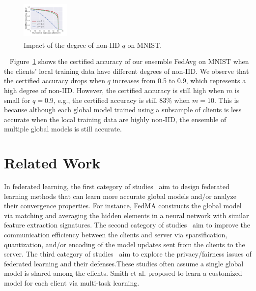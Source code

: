 \documentclass[letterpaper]{article} %
\newcommand{\myparatight}[1]{\smallskip\noindent{\bf {#1}:}~}
\begin{document}
\begin{figure}[!t]
\center
\includegraphics[width=0.20700000000000002\textwidth,height=0.76in ]{./figs/mnist/mnist_cnn_k10_bias.pdf}
\caption{Impact of the degree of non-IID $q$ on MNIST.}
\label{fig:q}
\end{figure}

\myparatight{Impact of degree of non-IID $q$} Figure~\ref{fig:q} shows the certified accuracy of our ensemble FedAvg on MNIST when the clients' local training data have different degrees of non-IID. We observe that the certified accuracy drops when $q$ increases from 0.5 to 0.9, which represents a high degree of non-IID. However, the certified accuracy is still high when $m$ is small for $q=0.9$, e.g., the certified accuracy is still 83\% when $m=10$.  This is because  although each global model trained using a subsample of clients is less accurate when the local training data are highly non-IID, the ensemble of multiple global models is still accurate.


\vspace{-1.37mm}
\section{Related Work}
\vspace{-0.86mm}
\vspace{-1.43mm}
In federated learning, the first category of studies~\cite{smith2017federated,li2019convergence,wang2020federated,liu2020federated,peng2019federated} aim to design  federated learning methods that can learn more accurate global models and/or analyze their convergence properties. For instance, FedMA \cite{wang2020federated} constructs the global model via matching and averaging the hidden elements in a neural network with similar feature extraction signatures. The second category of studies~\cite{konevcny2016federated,mcmahan2016communication,wen2017terngrad,alistarh2017qsgd,lee2017speeding,sahu2018convergence,bernstein2018signsgd,vogels2019powersgd,yurochkin2019bayesian,mohri2019agnostic,wang2020federated,li2020practical,li2020acceleration,hamer2020fedboost,rothchildfetchsgd,malinovsky2020local} aim to improve the communication efficiency between the clients and server via sparsification, quantization, and/or encoding of the model updates sent from the clients to the server. The third category of studies~\cite{bonawitz2017practical,geyer2017differentially,hitaj2017deep,melis2019exploiting,zhu2019deep,mohri2019agnostic,wang2020federatedlatent,Li2020Fair} aim to explore the privacy/fairness issues of federated learning and their defenses.These studies often assume a single global model is shared among the clients.  Smith et al. \cite{smith2017federated} proposed to learn a customized model for each client via multi-task learning.
\end{document}
